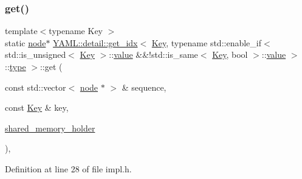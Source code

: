 \subsubsection{\texorpdfstring{get()}{get()}\hspace{0.1cm}{\footnotesize\ttfamily [1/2]}}
{\footnotesize\ttfamily template$<$typename Key $>$ \\
static \mbox{\hyperlink{class_y_a_m_l_1_1detail_1_1node}{node}}$\ast$ \mbox{\hyperlink{struct_y_a_m_l_1_1detail_1_1get__idx}{Y\+A\+M\+L\+::detail\+::get\+\_\+idx}}$<$ \mbox{\hyperlink{namespace_y_a_m_l_a67c320aa50d3de7ecba1d0b8775dd684a1af533fc24b0311b8c4d5ac2870283aa}{Key}}, typename std\+::enable\+\_\+if$<$ std\+::is\+\_\+unsigned$<$ \mbox{\hyperlink{namespace_y_a_m_l_a67c320aa50d3de7ecba1d0b8775dd684a1af533fc24b0311b8c4d5ac2870283aa}{Key}} $>$\+::\mbox{\hyperlink{glad_8h_a03aff08f73d7fde3d1a08e0abd8e84fa}{value}} \&\&!std\+::is\+\_\+same$<$ \mbox{\hyperlink{namespace_y_a_m_l_a67c320aa50d3de7ecba1d0b8775dd684a1af533fc24b0311b8c4d5ac2870283aa}{Key}}, bool $>$\+::\mbox{\hyperlink{glad_8h_a03aff08f73d7fde3d1a08e0abd8e84fa}{value}} $>$\+::\mbox{\hyperlink{glad_8h_a890efa53b3d7deeeced6f3a0d6653ed3}{type}} $>$\+::get (\begin{DoxyParamCaption}\item[{const std\+::vector$<$ \mbox{\hyperlink{class_y_a_m_l_1_1detail_1_1node}{node}} $\ast$ $>$ \&}]{sequence,  }\item[{const \mbox{\hyperlink{namespace_y_a_m_l_a67c320aa50d3de7ecba1d0b8775dd684a1af533fc24b0311b8c4d5ac2870283aa}{Key}} \&}]{key,  }\item[{\mbox{\hyperlink{namespace_y_a_m_l_1_1detail_a228c4b3b6ba1058b474d40afc218e21d}{shared\+\_\+memory\+\_\+holder}}}]{ }\end{DoxyParamCaption})\hspace{0.3cm}{\ttfamily [inline]}, {\ttfamily [static]}}



Definition at line 28 of file impl.\+h.

\mbox{\label{struct_y_a_m_l_1_1detail_1_1get__idx_3_01_key_00_01typename_01std_1_1enable__if_3_01std_1_1is__u08dca2a68e6a8b25fe3451a1a4ed02f5_a2bb6c7b83286e26970bb21e5c635aced}} 
